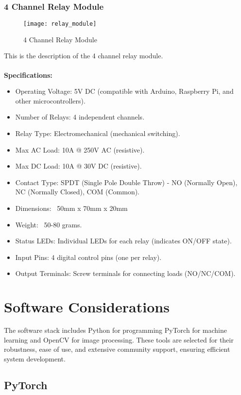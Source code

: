 \subsubsection{4 Channel Relay Module}
\begin{figure}[!htbp]
	\centering
	\texttt{[image: relay\_module]}
	\caption{4 Channel Relay Module}
	\label{fig:relay_module_fig}
\end{figure}
This is the description of the 4 channel relay module.
\\
\\
\textbf{Specifications:}
\begin{itemize}
    \item Operating Voltage: 5V DC (compatible with Arduino, Raspberry Pi, and other microcontrollers).
    \item Number of Relays: 4 independent channels.
    \item Relay Type: Electromechanical (mechanical switching).
    \item Max AC Load: 10A @ 250V AC (resistive).
    \item Max DC Load: 10A @ 30V DC (resistive).
    \item Contact Type: SPDT (Single Pole Double Throw) - NO (Normally Open), NC (Normally Closed), COM (Common).
    \item Dimensions: ~50mm x 70mm x 20mm 
    \item Weight: ~50-80 grams.
    \item Status LEDs: Individual LEDs for each relay (indicates ON/OFF state).
    \item Input Pins: 4 digital control pins (one per relay).
    \item Output Terminals: Screw terminals for connecting loads (NO/NC/COM).
\end{itemize}

\section{Software Considerations}
The software stack includes Python for programming PyTorch for machine learning and OpenCV for image processing. These tools are selected for their robustness, ease of use, and extensive community support, ensuring efficient system development.

\subsection{PyTorch}

